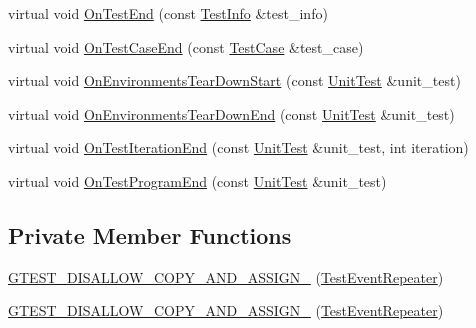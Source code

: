 \begin{DoxyCompactItemize}
\item 
virtual void \hyperlink{classtesting_1_1internal_1_1TestEventRepeater_a57247960bc1147abddf11908402394c1}{\-On\-Test\-End} (const \hyperlink{classtesting_1_1TestInfo}{\-Test\-Info} \&test\-\_\-info)
\item 
virtual void \hyperlink{classtesting_1_1internal_1_1TestEventRepeater_a3cc06a6f14e5734766b458543ca2115e}{\-On\-Test\-Case\-End} (const \hyperlink{classtesting_1_1TestCase}{\-Test\-Case} \&test\-\_\-case)
\item 
virtual void \hyperlink{classtesting_1_1internal_1_1TestEventRepeater_a3dd57271e7f1c9b85e8280acc6114b03}{\-On\-Environments\-Tear\-Down\-Start} (const \hyperlink{classtesting_1_1UnitTest}{\-Unit\-Test} \&unit\-\_\-test)
\item 
virtual void \hyperlink{classtesting_1_1internal_1_1TestEventRepeater_aa4355567b2991e8e38e4fcb964f44387}{\-On\-Environments\-Tear\-Down\-End} (const \hyperlink{classtesting_1_1UnitTest}{\-Unit\-Test} \&unit\-\_\-test)
\item 
virtual void \hyperlink{classtesting_1_1internal_1_1TestEventRepeater_a736a6086d1aca9c9d63810d73ea1ef0e}{\-On\-Test\-Iteration\-End} (const \hyperlink{classtesting_1_1UnitTest}{\-Unit\-Test} \&unit\-\_\-test, int iteration)
\item 
virtual void \hyperlink{classtesting_1_1internal_1_1TestEventRepeater_a01d008c30d3b3e73f55f77aabc4cbbb9}{\-On\-Test\-Program\-End} (const \hyperlink{classtesting_1_1UnitTest}{\-Unit\-Test} \&unit\-\_\-test)
\end{DoxyCompactItemize}
\subsection*{\-Private \-Member \-Functions}
\begin{DoxyCompactItemize}
\item 
\hyperlink{classtesting_1_1internal_1_1TestEventRepeater_a95320dee7678ac1035017209dd8cbac5}{\-G\-T\-E\-S\-T\-\_\-\-D\-I\-S\-A\-L\-L\-O\-W\-\_\-\-C\-O\-P\-Y\-\_\-\-A\-N\-D\-\_\-\-A\-S\-S\-I\-G\-N\-\_\-} (\hyperlink{classtesting_1_1internal_1_1TestEventRepeater}{\-Test\-Event\-Repeater})
\item 
\hyperlink{classtesting_1_1internal_1_1TestEventRepeater_a95320dee7678ac1035017209dd8cbac5}{\-G\-T\-E\-S\-T\-\_\-\-D\-I\-S\-A\-L\-L\-O\-W\-\_\-\-C\-O\-P\-Y\-\_\-\-A\-N\-D\-\_\-\-A\-S\-S\-I\-G\-N\-\_\-} (\hyperlink{classtesting_1_1internal_1_1TestEventRepeater}{\-Test\-Event\-Repeater})
\end{DoxyCompactItemize}
